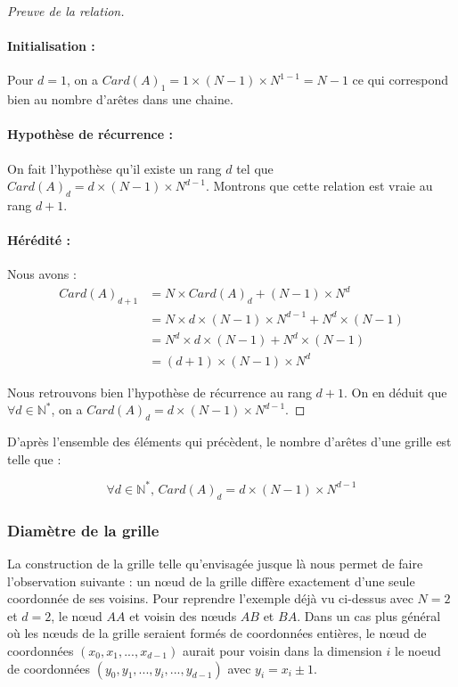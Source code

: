 \begin{proof}[Preuve de la relation]
\item
\paragraph{Initialisation :} 
Pour $d=1$, on a $Card(A)_1 = 1\times (N-1)\times N^{1-1} = N-1$ ce qui correspond bien au nombre d'arêtes dans une chaine.

\paragraph{Hypothèse de récurrence :}
On fait l'hypothèse qu'il existe un rang $d$ tel que $Card(A)_d = d\times (N-1)\times N^{d-1}$. Montrons que cette relation est vraie au rang $d+1$.

\paragraph{Hérédité :} Nous avons :
\begin{align*}
Card(A)_{d+1} & = N \times Card(A)_d + (N-1)\times N^d \\
& = N\times d\times (N-1)\times N^{d-1} + N^d\times (N-1)\\
& = N^d\times d\times (N-1) + N^d\times (N-1)\\
& = (d+1)\times (N-1)\times N^d
\end{align*}

Nous retrouvons bien l'hypothèse de récurrence au rang $d+1$. On en déduit que $\forall d \in \mathbb{N^*}$, on a $Card(A)_d = d\times (N-1)\times N^{d-1}$.
\end{proof}

D'après l'ensemble des éléments qui précèdent, le nombre d'arêtes d'une grille est telle que :

$$\forall d \in \mathbb{N^*} \text{, }Card(A)_d = d\times (N-1)\times N^{d-1} $$ 


\subsubsection{Diamètre de la grille}

La construction de la grille telle qu'envisagée jusque là nous permet de faire l'observation suivante : un nœud de la grille diffère exactement d'une seule coordonnée de ses voisins. Pour reprendre l'exemple déjà vu ci-dessus avec $N=2$ et $d=2$, le nœud $AA$ et voisin des nœuds $AB$ et $BA$. Dans un cas plus général où les nœuds de la grille seraient formés de coordonnées entières, le nœud de coordonnées $(x_0,x_1, ..., x_{d-1})$ aurait pour voisin dans la dimension $i$ le noeud de coordonnées $(y_0,y_1,...,y_i,...,y_{d-1})$ avec $y_i=x_i\pm1$.

